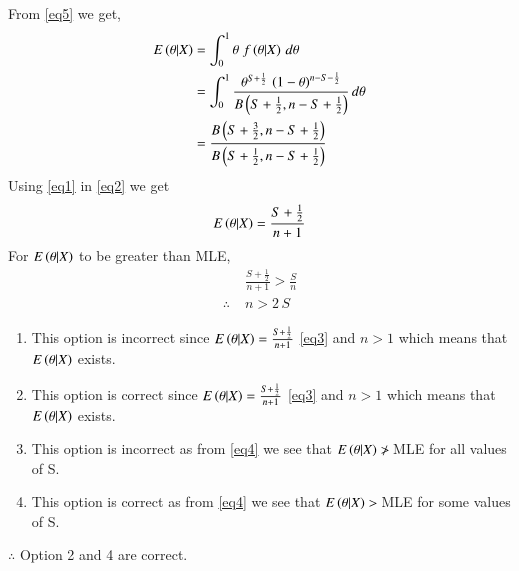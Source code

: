 \documentclass[journal,12pt,twocolumn]{IEEEtran}
\begin{document}
From \eqref{eq5} we get,
\begin{align}
    E\left(\theta|X\right) &= \int_0^1 \theta\;f\left(\theta|X\right)\,d\theta\nonumber\\
    &=\int_0^1 \frac{\theta^{S+\frac{1}{2}}\,\left(1-\theta\right)^{n-S-\frac{1}{2}}}{B\left(S+\frac{1}{2},n-S+\frac{1}{2}\right)}\,d\theta\nonumber\\
    &=\frac{B\left(S+\frac{3}{2},n-S+\frac{1}{2}\right)}{B\left(S+\frac{1}{2},n-S+\frac{1}{2}\right)}\label{eq2}
\end{align}
Using \eqref{eq1} in \eqref{eq2} we get
\begin{align}
    E\left(\theta|X\right) = \frac{S+\frac{1}{2}}{n+1}\label{eq3}
\end{align}
For $E\left(\theta|X\right)$ to be greater than MLE,
\begin{align}
    &\frac{S+\frac{1}{2}}{n+1} > \frac{S}{n}\nonumber\\
     \therefore\;&n>2\,S\label{eq4}
\end{align}
\begin{enumerate}
    \item This option is incorrect since $E\left(\theta|X\right) = \frac{S+\frac{1}{2}}{n+1}$ \eqref{eq3} and $n>1$ which means that $E\left(\theta|X\right)$ exists.
    \item This option is correct since $E\left(\theta|X\right) = \frac{S+\frac{1}{2}}{n+1}$ \eqref{eq3} and $n>1$ which means that $E\left(\theta|X\right)$ exists.
    \item This option is incorrect as from \eqref{eq4} we see that $E\left(\theta|X\right)\ngtr\, $MLE for all values of S.
    \item This option is correct as from \eqref{eq4} we see that $E\left(\theta|X\right)>\, $MLE for some values of S.
\end{enumerate}
$\therefore$ Option 2 and 4 are correct.\\
\end{document}
